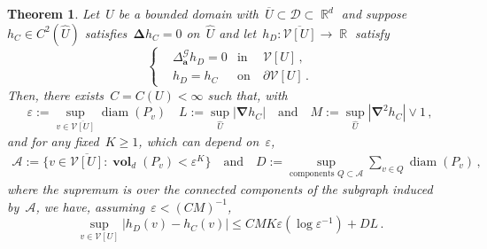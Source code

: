 \documentclass[12pt]{amsart}
\numberwithin{equation}{section}
\DeclareMathOperator{\R}{\mathbb{R}}
\DeclareMathOperator{\diam}{{\mathop{diam}}}
\newtheorem{theorem}{Theorem}[section]
\newcommand{\V}{\mathcal{V}}
\newcommand{\eps}{\varepsilon}
\newcommand{\CLap}{\boldsymbol{\Delta}}
\newcommand{\Cnabla}{\boldsymbol{\nabla}}
\newcommand{\aDelta}{\hyperref[eq:geometric-laplacian]{{\Delta^{\mathcal{G}}_{\cond}}}}
\newcommand{\cond}{\hyperref[eq:geometric-laplacian]{\mathbf{a}}}
\newcommand{\GCU}{\hyperref[eq:graph-closure]{\widehat{U}}}
\DeclareMathOperator{\vol}{\mathbf{vol}}
\begin{document}
\begin{theorem}
		\label{theorem:generaldim}
	Let~$U$ be a bounded domain with~$\overline{U} \subset \mathcal{D} \subset \R^d$ and suppose~$h_C \in C^{2}(\GCU)$ satisfies~$\CLap h_C = 0$ on~$\GCU$ and let~$h_D: \overline{\V[U]} \to \R$ satisfy 
	\[
	\left\{
	\begin{aligned}
		&  \aDelta h_D = 0 & \mbox{in} & \ \V[U] \,,
		\\
		& h_D = h_C & \mbox{on} & \  \partial \V[U] \, . 
	\end{aligned}
	\right.
	\]
	Then, there exists~$C= C(U) < \infty$ such that, with
	\[
	\eps := \sup_{v \in \overline{\V[U]}} \diam(P_v) \quad L := \sup_{\GCU} |\Cnabla h_C| \quad \mbox{and} \quad M := \sup_{\GCU} |\Cnabla^2 h_C| \vee 1 \, , 
	\]
	and for any fixed~$K \geq 1$, which can depend on~$\eps$,
	\begin{equation}
		\begin{aligned}
		\label{eq:small-volume-assumption}
		\mathcal{A} := \{ v \in \overline{\V[U]} : \vol_{d}(P_v) < \eps^{K}  \}  \quad \mbox{and} \quad
		D := \sup_{\mbox{components $Q \subset \mathcal{A}$}} {\sum_{v \in Q} \diam(P_v)}  \, , 
		\end{aligned}
	\end{equation}
	where the supremum is over the connected components of the subgraph induced by~$\mathcal{A}$, we have, assuming~{$\eps  < (C M)^{-1}$},
	\begin{equation} 
		\label{eq:full-bound}
{	 \sup_{v \in \V[U]} | h_D(v) - h_C(v) | \leq C M K \eps(\log \eps^{-1}) + D L  \, .}
	\end{equation}
\end{theorem}
\end{document}
